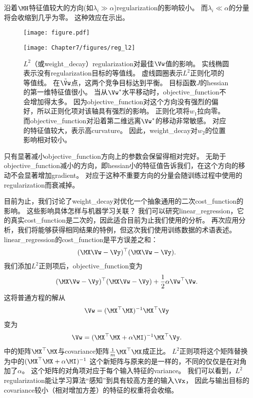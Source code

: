 沿着$\MH$特征值较大的方向(如$\lambda_i \gg \alpha$)\gls{regularization}的影响较小。
而$\lambda_i \ll \alpha$的分量将会收缩到几乎为零。
这种效应在示出。
\begin{figure}[!htb]
\ifOpenSource
\centerline{\texttt{[image: figure.pdf]}}
\else
\centerline{\texttt{[image: Chapter7/figures/reg\_l2]}}
\fi
\caption{$L^2$（或\gls{weight_decay}）\gls{regularization}对最佳$\Vw$值的影响。
实线椭圆表示没有\gls{regularization}目标的等值线。
虚线圆圈表示$L^2$正则化项的等值线。
在$\tilde{\Vw}$点，这两个竞争目标达到平衡。
目标函数$J$的\gls{hessian}的第一维特征值很小。
当从$\Vw^*$水平移动时，\gls{objective_function}不会增加得太多。
因为\gls{objective_function}对这个方向没有强烈的偏好，所以正则化项对该轴具有强烈的影响。
正则化项将$w_1$拉向零。
而\gls{objective_function}对沿着第二维远离$\Vw^*$的移动非常敏感。
对应的特征值较大，表示高\gls{curvature}。
因此，\gls{weight_decay}对$w_2$的位置影响相对较小。
}
\label{fig:chap7_reg_l2}
\end{figure}


只有显著减小\gls{objective_function}方向上的参数会保留得相对完好。
无助于\gls{objective_function}减小的方向，即\gls{hessian}小的特征值告诉我们，在这个方向的移动不会显著增加\gls{gradient}。
对应于这种不重要方向的分量会随训练过程中使用的\gls{regularization}而衰减掉。


目前为止，我们讨论了\gls{weight_decay}对优化一个抽象通用的二次\gls{cost_function}的影响。
这些影响具体怎样与机器学习关联？
我们可以研究\gls{linear_regression}，它的真实\gls{cost_function}是二次的，因此适合目前为止我们使用的分析。
再次应用分析，我们将能够获得相同结果的特例，但这次我们使用训练数据的术语表述。
\gls{linear_regression}的\gls{cost_function}是平方误差之和：
\begin{align}
 (\MX \Vw - \Vy)^\top (\MX \Vw - \Vy).
\end{align}
我们添加$L^2$正则项后，\gls{objective_function}变为
\begin{align}
  (\MX \Vw - \Vy)^\top (\MX \Vw - \Vy) + \frac{1}{2}\alpha \Vw^\top \Vw.
\end{align}
这将普通方程的解从
\begin{align}
\label{eq:716w}
  \Vw = (\MX^\top \MX)^{-1} \MX^\top \Vy
\end{align}
变为
\begin{align}
\label{eq:717mw}
   \Vw = (\MX^\top \MX + \alpha \MI)^{-1} \MX^\top \Vy .
\end{align}
中的矩阵$\MX^\top\MX$与\gls{covariance}矩阵$\frac{1}{m}\MX^\top\MX$成正比。
$L^2$正则项将这个矩阵替换为中的$ (\MX^\top \MX + \alpha \MI)^{-1}$
这个新矩阵与原来的是一样的，不同的仅仅是在对角加了$\alpha$。
这个矩阵的对角项对应于每个输入特征的\gls{variance}。
我们可以看到，$L^2$\gls{regularization}能让学习算法``感知''到具有较高方差的输入$\Vx$， 因此与输出目标的\gls{covariance}较小（相对增加方差）的特征的权重将会收缩。

